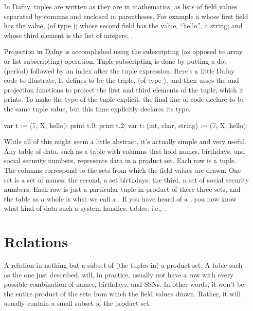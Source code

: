 \documentclass[letterpaper,10pt,english]{sphinxmanual}
\begin{document}
In Dafny, tuples are written as they are in mathematics, as lists of
field values separated by commas and enclosed in parentheses.  For
example  a  whose
first field has the value,  (of type ); whose second field has
the value, “hello”, a string; and whose third element is the list of
integers, \sphinxstyleemphasis{{[}2, 4, 6{]}}.

Projection in Dafny is accomplished using the  subscripting (as
opposed to array or list subscripting) operation. Tuple subscripting is
done by putting a dot (period) followed by an index after the tuple
expression. Here’s a little Dafny code to illustrate. It defines 
to be the triple,  (of type ),
and then usses the  and  projection functions to project the
first and third elements of the tuple, which it prints. To make the
type of the tuple explicit, the final line of code declare  to be
the same tuple value, but this time explicitly declares its type.

\begin{sphinxVerbatim}[commandchars=\\\{\}]
var t := (7, \PYGZsq{}X\PYGZsq{}, \PYGZdq{}hello\PYGZdq{});
print t.0;
print t.2;
var t\PYGZsq{}: (int, char, string) := (7, \PYGZsq{}X\PYGZsq{}, \PYGZdq{}hello\PYGZdq{});
\end{sphinxVerbatim}

While all of this might seem a little abstract, it’s actually simple
and very useful. Any table of data, such as a table with columns that
hold names, birthdays, and social security numbers, represents data in
a product set. Each row is a tuple. The columns correspond to the sets
from which the field values are drawn. One set is a set of names; the
second, a set birthdays; the third, a set of social security numbers.
Each row is just a particular tuple in product of these three sets,
and the table as a whole is what we call a . If you have
heard of a , you now know what kind of data such
a system handles: tables, i.e., .


\chapter{Relations}
\label{\detokenize{08-relations:relations}}\label{\detokenize{08-relations::doc}}
A relation in nothing but a subset of (the tuples in) a product set. A
table such as the one just described, will, in practice, usually not
have a row with every possible combination of names, birthdays, and
SSNs. In other words, it won’t be the entire product of the sets from
which the field values drawn. Rather, it will usually contain a small
subset of the product set.
\end{document}
